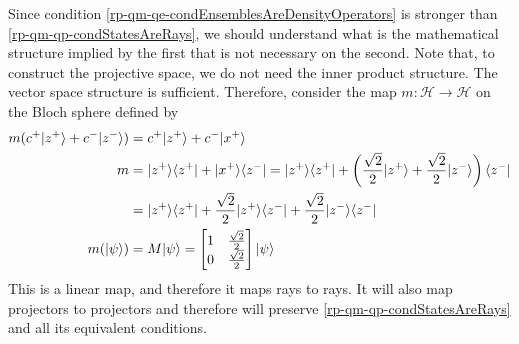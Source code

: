 Since condition \ref{rp-qm-qe-condEnsemblesAreDensityOperators} is stronger than \ref{rp-qm-qp-condStatesAreRays}, we should understand what is the mathematical structure implied by the first that is not necessary on the second. Note that, to construct the projective space, we do not need the inner product structure. The vector space structure is sufficient. Therefore, consider the map $m : \mathcal{H} \to \mathcal{H}$ on the Bloch sphere defined by
\begin{equation}
	\begin{aligned}
		m(c^+|z^+\rangle+c^- |z^-\rangle) &= c^+|z^+\rangle + c^- |x^+\rangle \\
		m &= |z^+\rangle\langle z^+| + |x^+\rangle\langle z^-| = |z^+\rangle\langle z^+| + \left(\frac{\sqrt{2}}{2}|z^+\rangle+\frac{\sqrt{2}}{2}|z^-\rangle\right)\langle z^-| \\
		&= |z^+\rangle\langle z^+| + \frac{\sqrt{2}}{2} |z^+\rangle\langle z^-| + \frac{\sqrt{2}}{2}|z^-\rangle\langle z^-| \\
		m(|\psi\rangle) &= M |\psi\rangle = \begin{bmatrix} 1 & \frac{\sqrt{2}}{2} \\ 0 & \frac{\sqrt{2}}{2} \end{bmatrix} |\psi\rangle
	\end{aligned}
\end{equation}
This is a linear map, and therefore it maps rays to rays. It will also map projectors to projectors and therefore will preserve \ref{rp-qm-qp-condStatesAreRays} and all its equivalent conditions.

